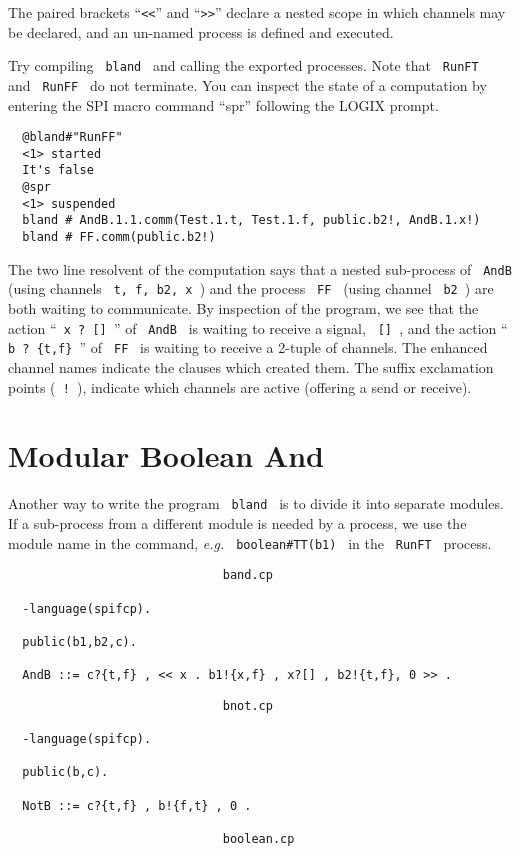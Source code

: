 \noindent
The paired brackets ``\verb+<<+'' and ``\verb+>>+'' declare
a nested scope in which channels may be declared, and an
un-named process is defined and executed.

\noindent
Try compiling \verb+ bland + and calling the exported processes.
Note that \verb+ RunFT + and \verb+ RunFF + do not terminate.  You
can inspect the state of a computation by entering the SPI macro command
``spr'' following the LOGIX prompt.

\begin{verbatim}
  @bland#"RunFF"
  <1> started
  It's false
  @spr
  <1> suspended
  bland # AndB.1.1.comm(Test.1.t, Test.1.f, public.b2!, AndB.1.x!)
  bland # FF.comm(public.b2!)
\end{verbatim}

\noindent
The two line resolvent of the computation says that a nested sub-process of
\verb+ AndB + (using channels \verb+ t, f, b2, x +) and the process
\verb+ FF + (using channel \verb+ b2 +) are both waiting to communicate.
By inspection of the program, we see that the action ``\verb+ x ? [] +''
of \verb+ AndB + is waiting to receive a signal, \verb+ [] +, and the
action ``\verb+ b ? {t,f} +'' of \verb+ FF + is waiting to receive a
2-tuple of channels.  The enhanced channel names indicate the clauses
which created them.  The suffix exclamation points (\verb+ ! +),
indicate which channels are active (offering a send or receive).

\section{Modular Boolean And}
\label{mbland}
Another way to write the program \verb+ bland + is to divide it
into separate modules. If a sub-process from a different module is
needed by a process, we use the module name in the command, {\em e.g.}
\verb+ boolean#TT(b1) + in the \verb+ RunFT + process.

\begin{verbatim}
                              band.cp

  -language(spifcp).

  public(b1,b2,c).

  AndB ::= c?{t,f} , << x . b1!{x,f} , x?[] , b2!{t,f}, 0 >> .
\end{verbatim}

\begin{verbatim}
                              bnot.cp

  -language(spifcp).

  public(b,c).

  NotB ::= c?{t,f} , b!{f,t} , 0 .

                              boolean.cp
\end{verbatim}

